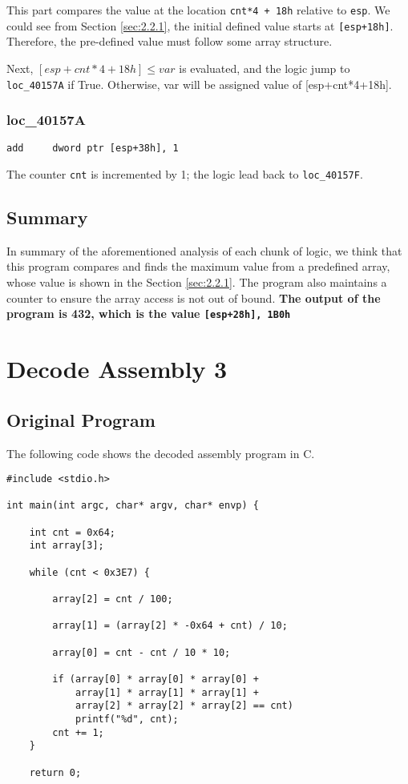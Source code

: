 \documentclass[11pt]{article}
\begin{document}
This part compares the value at the location \lstinline{cnt*4 + 18h} relative to \lstinline{esp}. We could see from Section \ref{sec:2.2.1}, the initial defined value starts at \lstinline{[esp+18h]}. Therefore, the pre-defined value must follow some array structure. 

Next, $[esp+cnt*4+18h] \leq var$ is evaluated, and the logic jump to \lstinline{loc_40157A} if True. Otherwise, var will be assigned value of [esp+cnt*4+18h].

\subsubsection{loc\_40157A}

\begin{lstlisting}[language={[x86masm]Assembler}]
add     dword ptr [esp+38h], 1
\end{lstlisting}

The counter \lstinline{cnt} is incremented by 1; the logic lead back to \lstinline{loc_40157F}.

\subsection{Summary}

In summary of the aforementioned analysis of each chunk of logic, we think that this program compares and finds the maximum value from a predefined array, whose value is shown in the Section \ref{sec:2.2.1}. The program also maintains a counter to ensure the array access is not out of bound. \textbf{The output of the program is 432, which is the value \lstinline{[esp+28h], 1B0h}}


\section{Decode Assembly 3}

\subsection{Original Program}

The following code shows the decoded assembly program in C.

\begin{lstlisting}[style=CStyle]
#include <stdio.h>

int main(int argc, char* argv, char* envp) {

    int cnt = 0x64;
    int array[3];

    while (cnt < 0x3E7) {
        
        array[2] = cnt / 100;

        array[1] = (array[2] * -0x64 + cnt) / 10;
        
        array[0] = cnt - cnt / 10 * 10;

        if (array[0] * array[0] * array[0] +
            array[1] * array[1] * array[1] + 
            array[2] * array[2] * array[2] == cnt)
            printf("%d", cnt);
        cnt += 1;
    }

    return 0;
\end{lstlisting}
\end{document}

